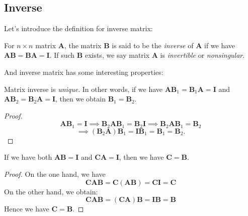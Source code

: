 \subsection{Inverse}
Let's introduce the definition for inverse matrix:
\begin{definition}
For $n\times n$ matrix $\bm A$, the matrix $\bm B$ is said to be the \emph{inverse} of $\bm A$ if we have $\bm A\bm B = \bm B\bm A = \bm I$. If such $\bm B$ exists, we say matrix $\bm A$ is \emph{invertible} or \emph{nonsingular}.
\end{definition}
And inverse matrix has some interesting properties:
\begin{proposition}
Matrix inverse is \textit{unique}. In other words, if we have $\bm A\bm B_1 = \bm B_1\bm A=\bm I$ and $\bm A\bm B_2 =\bm B_2\bm A= \bm I$, then we obtain $\bm B_1 = \bm B_2$.
\end{proposition}
\begin{proof}
\[
\bm A\bm B_1 = \bm I\implies \bm B_2\bm A\bm B_1 = \bm B_2\bm I\implies\bm B_2\bm A\bm B_1 = \bm B_2
\]
\[
\implies (\bm B_2\bm A)\bm B_1 =\bm I\bm B_1=\bm B_1= \bm B_2.
\]
\end{proof}
\newpage

\begin{proposition}
If we have both $\bm A\bm B = \bm I$ and $\bm C\bm A = \bm I$, then we have $\bm C = \bm B$.
\end{proposition}
\begin{proof}On the one hand, we have
\[
\bm{CAB} = \bm C(\bm{AB}) = \bm C\bm I = \bm C
\]
On the other hand, we obtain:
\[
\bm{CAB} = (\bm C\bm A)\bm B = \bm I\bm B = \bm B
\]
Hence we have $\bm C = \bm B$.
\end{proof}
